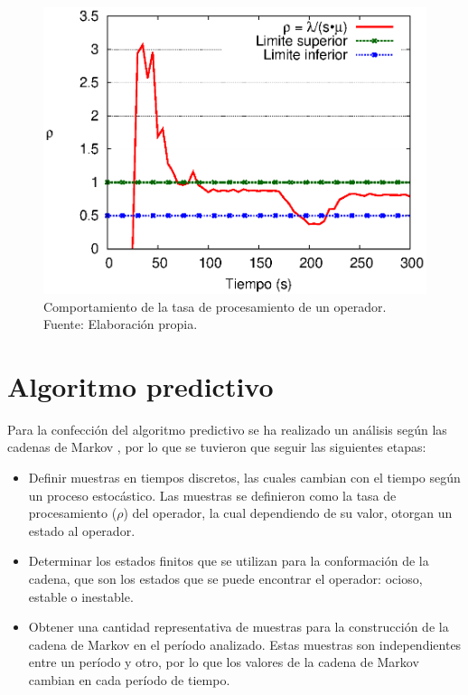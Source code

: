 \begin{figure}[ht!]
  \centering
  \captionsetup{justification=centering}
    \includegraphics[scale=0.8]{images/Umbrales.eps}
	\caption[Comportamiento de la tasa de procesamiento de un operador.]{Comportamiento de la tasa de procesamiento de un operador. \\ Fuente: Elaboraci\'on propia.}
  \label{fig:umbrales}
\end{figure}


\section{Algoritmo predictivo}
Para la confecci\'on del algoritmo predictivo se ha realizado un an\'alisis seg\'un las cadenas de Markov \citep{ching2006markov}, por lo que se tuvieron que seguir las siguientes etapas:

\begin{itemize}
	\item Definir muestras en tiempos discretos, las cuales cambian con el tiempo seg\'un un proceso estoc\'astico. Las muestras se definieron como la tasa de procesamiento ($\rho$) del operador, la cual dependiendo de su valor, otorgan un estado al operador.
	\item Determinar los estados finitos que se utilizan para la conformaci\'on de la cadena, que son los estados que se puede encontrar el operador: ocioso, estable o inestable.
	\item Obtener una cantidad representativa de muestras para la construcci\'on de la cadena de Markov en el per\'iodo analizado. Estas muestras son independientes entre un per\'iodo y otro, por lo que los valores de la cadena de Markov cambian en cada per\'iodo de tiempo. %
\end{itemize}

